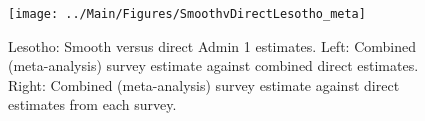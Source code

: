 \documentclass[12pt]{article}\usepackage[]{graphicx}\usepackage[]{color}
\newenvironment{knitrout}{}{} %
\begin{document}

\begin{knitrout}
\color{fgcolor}\begin{figure}[bht]

{\centering \texttt{[image: ../Main/Figures/SmoothvDirectLesotho\_meta]} 

}

\caption[Lesotho]{Lesotho: Smooth versus direct Admin 1 estimates. Left: Combined (meta-analysis) survey estimate against combined direct estimates. Right: Combined (meta-analysis) survey estimate against direct estimates from each survey.}\label{fig:unnamed-chunk-173}
\end{figure}


\end{knitrout}
\end{document}
